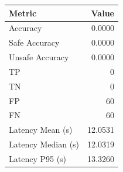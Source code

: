 \begin{table}[ht]
\centering
\begin{tabular}{lr}
\toprule
Metric & Value \\
\midrule
Accuracy & 0.0000 \\
Safe Accuracy & 0.0000 \\
Unsafe Accuracy & 0.0000 \\
TP & 0 \\
TN & 0 \\
FP & 60 \\
FN & 60 \\
Latency Mean (s) & 12.0531 \\
Latency Median (s) & 12.0319 \\
Latency P95 (s) & 13.3260 \\
\bottomrule
\end{tabular}
\end{table}